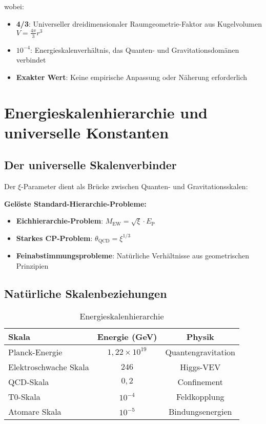 \documentclass[12pt,a4paper]{report}
\newcommand{\EP}{E_{\text{P}}}            %
\begin{document}
	wobei:
	\begin{itemize}
		\item \textbf{4/3}: Universeller dreidimensionaler Raumgeometrie-Faktor aus Kugelvolumen $V = \frac{4\pi}{3}r^3$
		\item \textbf{$10^{-4}$}: Energieskalenverhältnis, das Quanten- und Gravitationsdomänen verbindet
		\item \textbf{Exakter Wert}: Keine empirische Anpassung oder Näherung erforderlich
	\end{itemize}
	
	\section{Energieskalenhierarchie und universelle Konstanten}
	\label{sec:energy_scale_hierarchy}
	
	\subsection{Der universelle Skalenverbinder}
	\label{subsec:universal_scale_connector}
	
	Der $\xi$-Parameter dient als Brücke zwischen Quanten- und Gravitationsskalen:
	
	\textbf{Gelöste Standard-Hierarchie-Probleme:}
	\begin{itemize}
		\item \textbf{Eichhierarchie-Problem}: $M_{\text{EW}} = \sqrt{\xi} \cdot \EP$
		\item \textbf{Starkes CP-Problem}: $\theta_{\text{QCD}} = \xi^{1/3}$
		\item \textbf{Feinabstimmungsprobleme}: Natürliche Verhältnisse aus geometrischen Prinzipien
	\end{itemize}
	
	\subsection{Natürliche Skalenbeziehungen}
	\label{subsec:natural_scale_relationships}
	
\begin{table}[htbp]
	\centering
	\begin{tabular}{lcc}
		\toprule
		\textbf{Skala} & \textbf{Energie (GeV)} & \textbf{Physik} \\
		\midrule
		Planck-Energie & $1,22 \times 10^{19}$ & Quantengravitation \\
		Elektroschwache Skala & $246$ & Higgs-VEV \\
		QCD-Skala & $0,2$ & Confinement \\
		T0-Skala & $10^{-4}$ & Feldkopplung \\
		Atomare Skala & $10^{-5}$ & Bindungsenergien \\
		\bottomrule
	\end{tabular}
	\caption{Energieskalenhierarchie}
	\label{tab:energy_scales_no_xi}
\end{table}
\end{document}
